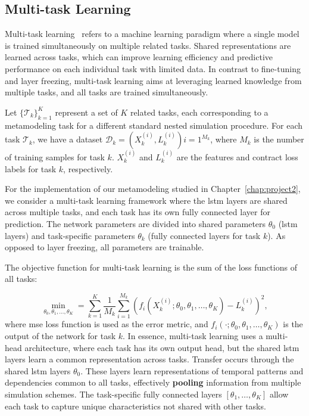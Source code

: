 \subsection{Multi-task Learning}

Multi-task learning~\citep{caruana1997multitask} refers to a machine learning paradigm where a single model is trained simultaneously on multiple related tasks.
Shared representations are learned across tasks, which can improve learning efficiency and predictive performance on each individual task with limited data.
In contrast to fine-tuning and layer freezing, multi-task learning aims at leveraging learned knowledge from multiple tasks, and all tasks are trained simultaneously.


Let $\{\mathcal{T}_k\}_{k=1}^K$ represent a set of $K$ related tasks, each corresponding to a metamodeling task for a different standard nested simulation procedure.
For each task $\mathcal{T}_k$, we have a dataset $\mathcal{D}_k = { (X_k^{(i)}, L_k^{(i)}) }{i=1}^{M_k}$, where $M_k$ is the number of training samples for task $k$.
$X_k^{(i)}$ and $L_k^{(i)}$ are the features and contract loss labels for task $k$, respectively.

For the implementation of our metamodeling studied in Chapter~\ref{chap:project2}, we consider a multi-task learning framework where the \gls{lstm} layers are shared across multiple tasks, and each task has its own fully connected layer for prediction.
The network parameters are divided into shared parameters $\theta_0$ (\gls{lstm} layers) and task-specific parameters $\theta_k$ (fully connected layers for task $k$). 
As opposed to layer freezing, all parameters are trainable.

The objective function for multi-task learning is the sum of the loss functions of all tasks:

\begin{equation} 
    \min_{\theta_0, \theta_1, \dots, \theta_K} = \sum_{k=1}^K \frac{1}{M_k} \sum_{i=1}^{M_k} \left( f_i(X_k^{(i)}; \theta_0, \theta_1, \dots, \theta_K) - L_k^{(i)} \right)^2,
\end{equation}
where \gls{mse} loss function is used as the error metric, and $f_i(\cdot; \theta_0, \theta_1, \dots, \theta_K)$ is the output of the network for task $k$.
In essence, multi-task learning uses a multi-head architecture, where each task has its own output head, but the shared \gls{lstm} layers learn a common representation across tasks.
Transfer occurs through the shared \gls{lstm} layers $\theta_0$. 
These layers learn representations of temporal patterns and dependencies common to all tasks, effectively \textbf{pooling} information from multiple simulation schemes. 
The task-specific fully connected layers $[\theta_1, \dots, \theta_K]$ allow each task to capture unique characteristics not shared with other tasks.


